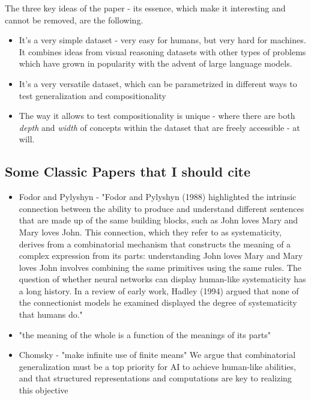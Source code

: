 The three key ideas of the paper - its essence, which make it interesting and cannot be removed, are the following.

\begin{itemize}
    \item It's a very simple dataset - very easy for humans, but very hard for machines. It combines ideas from visual reasoning datasets with other types of problems which have grown in popularity with the advent of large language models. 
    \item It's a very versatile dataset, which can be parametrized in different ways to test generalization and compositionality 
    \item The way it allows to test compositionality is unique - where there are both \textit{depth} and \textit{width} of concepts within the dataset that are freely accessible - at will.   
\end{itemize}


\subsection{Some Classic Papers that I should cite}

\begin{itemize}
    \item Fodor and Pylyshyn \cite{fodor1988connectionism} - "Fodor and Pylyshyn (1988) highlighted the intrinsic connection between the ability to produce and
    understand different sentences that are made up
    of the same building blocks, such as John loves
    Mary and Mary loves John. This connection, which
    they refer to as systematicity, derives from a combinatorial mechanism that constructs the meaning
    of a complex expression from its parts: understanding John loves Mary and Mary loves John
    involves combining the same primitives using the
    same rules. The question of whether neural networks can display human-like systematicity has a
    long history. In a review of early work, Hadley
    (1994) argued that none of the connectionist models he examined displayed the degree of systematicity that humans do."
    \item "the meaning of the whole is a function of the meanings of its parts" \cite{cresswell2016logics}
    \item Chomsky - "make infinite use of finite means" \cite{chomsky2014aspects}
    \cite{besold2016generality} We argue that combinatorial generalization must be a top priority for AI to achieve human-like abilities, and that structured representations and computations are key to realizing this objective
\end{itemize}
